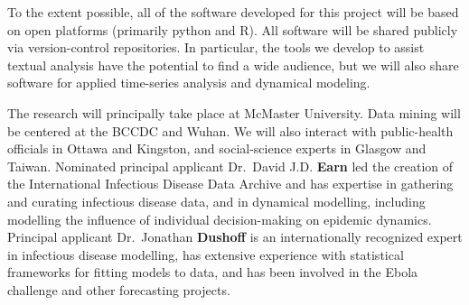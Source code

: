  To the extent possible, all of the software developed for this project will be based on open platforms (primarily python and R). All software will be shared publicly via version-control repositories. In particular, the tools we develop to assist textual analysis have the potential to find a wide audience, but we will also share software for applied time-series analysis and dynamical modeling.


The research will principally take place at McMaster University. Data mining will be centered at the BCCDC and Wuhan. We will also interact with public-health officials in Ottawa and Kingston, and social-science experts in Glasgow and Taiwan.
Nominated principal applicant Dr.\ David J.D. \textbf{Earn} led the creation of the International Infectious Disease Data Archive and has expertise in gathering and curating infectious disease data, and in dynamical modelling, including modelling the influence of individual decision-making on epidemic dynamics.
Principal applicant Dr.\ Jonathan \textbf{Dushoff} is an internationally recognized expert in infectious disease modelling, has extensive experience with statistical frameworks for fitting models to data, and has been involved in the Ebola challenge and other forecasting projects.

